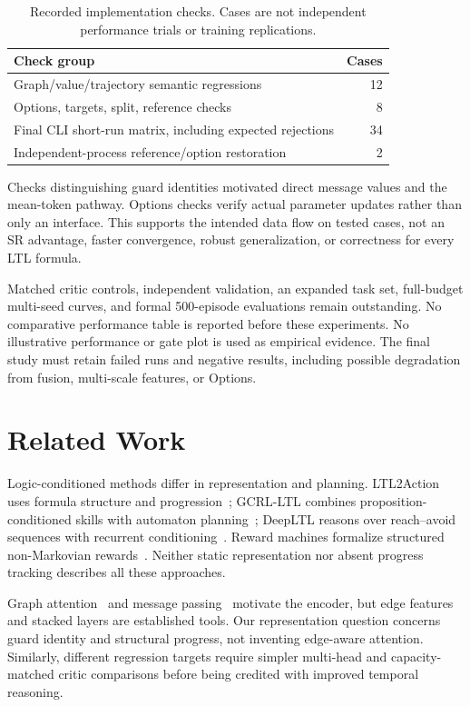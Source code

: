 \documentclass[conference]{IEEEtran}
\begin{document}
\begin{table}[t]
\caption{Recorded implementation checks. Cases are not independent performance trials or training replications.}
\label{tab:checks}
\centering\small
\begin{tabular}{@{}p{}r@{}}
\toprule
Check group & Cases \\ \midrule
Graph/value/trajectory semantic regressions & 12 \\
Options, targets, split, reference checks & 8 \\
Final CLI short-run matrix, including expected rejections & 34 \\
Independent-process reference/option restoration & 2 \\
\bottomrule
\end{tabular}
\end{table}

Checks distinguishing guard identities motivated direct message values and the mean-token pathway. Options checks verify actual parameter updates rather than only an interface. This supports the intended data flow on tested cases, not an SR advantage, faster convergence, robust generalization, or correctness for every LTL formula.

Matched critic controls, independent validation, an expanded task set, full-budget multi-seed curves, and formal 500-episode evaluations remain outstanding. No comparative performance table is reported before these experiments. No illustrative performance or gate plot is used as empirical evidence. The final study must retain failed runs and negative results, including possible degradation from fusion, multi-scale features, or Options.

\section{Related Work}
Logic-conditioned methods differ in representation and planning. LTL2Action uses formula structure and progression~\citep{Vaezipoor2021}; GCRL-LTL combines proposition-conditioned skills with automaton planning~\citep{Qiu2023}; DeepLTL reasons over reach--avoid sequences with recurrent conditioning~\citep{deepltl}. Reward machines formalize structured non-Markovian rewards~\citep{Icarte2022}. Neither static representation nor absent progress tracking describes all these approaches.

Graph attention~\citep{Velickovic2018,Brody2022} and message passing~\citep{Gilmer2017} motivate the encoder, but edge features and stacked layers are established tools. Our representation question concerns guard identity and structural progress, not inventing edge-aware attention. Similarly, different regression targets require simpler multi-head and capacity-matched critic comparisons before being credited with improved temporal reasoning.
\end{document}
